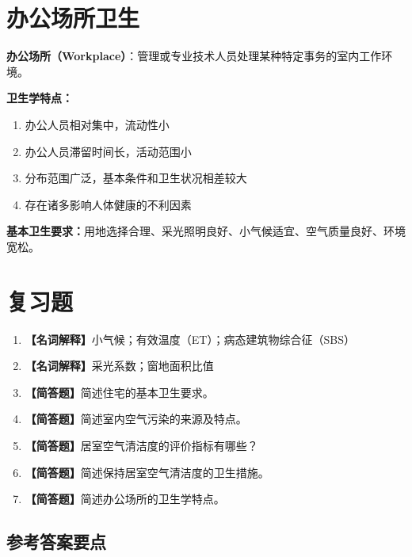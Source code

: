 \section{办公场所卫生}

\begin{defbox}
\textbf{办公场所（Workplace）}：管理或专业技术人员处理某种特定事务的室内工作环境。
\end{defbox}

\textbf{卫生学特点：}
\begin{enumerate}[leftmargin=*]
    \item 办公人员相对集中，流动性小
    \item 办公人员滞留时间长，活动范围小
    \item 分布范围广泛，基本条件和卫生状况相差较大
    \item 存在诸多影响人体健康的不利因素
\end{enumerate}

\textbf{基本卫生要求：}用地选择合理、采光照明良好、小气候适宜、空气质量良好、环境宽松。

\section{复习题}

\begin{enumerate}[leftmargin=*, itemsep=8pt]
    \item \textbf{【名词解释】}小气候；有效温度（ET）；病态建筑物综合征（SBS）
    \item \textbf{【名词解释】}采光系数；窗地面积比值
    \item \textbf{【简答题】}简述住宅的基本卫生要求。
    \item \textbf{【简答题】}简述室内空气污染的来源及特点。
    \item \textbf{【简答题】}居室空气清洁度的评价指标有哪些？
    \item \textbf{【简答题】}简述保持居室空气清洁度的卫生措施。
    \item \textbf{【简答题】}简述办公场所的卫生学特点。
\end{enumerate}

\subsection*{参考答案要点}

